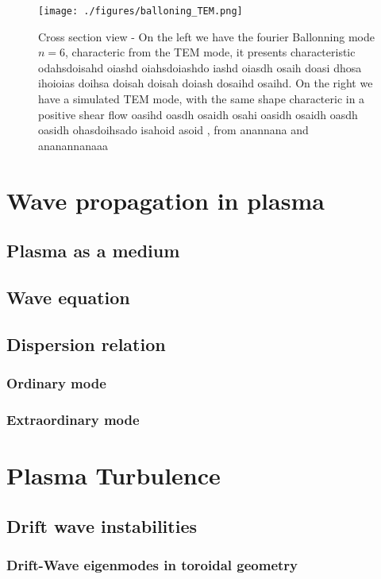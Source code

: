 \documentclass[11pt,a4paper]{report}
\begin{document}
\begin{figure}[H]
    \centering
    \texttt{[image: ./figures/balloning\_TEM.png]}
    \caption{Cross section view - On the left we have the fourier Ballonning mode $n = 6$, characteric from the TEM mode, it presents characteristic odahsdoisahd oiashd oiahsdoiashdo iashd oiasdh osaih doasi dhosa ihoioias doihsa doisah doisah doiash dosaihd osaihd. On the right we have a simulated TEM mode, with the same shape characteric in a positive shear flow oasihd oasdh osaidh osahi oasidh osaidh oasdh oasidh ohasdoihsado isahoid asoid , from anannana and ananannanaaa}
    \label{}
\end{figure}
\begin{multicols}{2}

    \section{Wave propagation in plasma}
    \subsection{Plasma as a medium}
    \subsection{Wave equation}
    \subsection{Dispersion relation}
    \subsubsection{Ordinary mode}
    \subsubsection{Extraordinary mode}

    \section{{Plasma Turbulence}}
    \subsection{Drift wave instabilities}
    \subsubsection{Drift-Wave eigenmodes in toroidal geometry}


\end{multicols}
\end{document}
